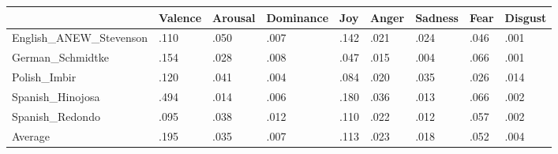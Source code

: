 \begin{tabular}{lllllllll}
\toprule
{} & Valence & Arousal & Dominance &  Joy & Anger & Sadness & Fear & Disgust \\
\midrule
English\_ANEW\_Stevenson &    .110 &    .050 &      .007 & .142 &  .021 &    .024 & .046 &    .001 \\
German\_Schmidtke       &    .154 &    .028 &      .008 & .047 &  .015 &    .004 & .066 &    .001 \\
Polish\_Imbir           &    .120 &    .041 &      .004 & .084 &  .020 &    .035 & .026 &    .014 \\
Spanish\_Hinojosa       &    .494 &    .014 &      .006 & .180 &  .036 &    .013 & .066 &    .002 \\
Spanish\_Redondo        &    .095 &    .038 &      .012 & .110 &  .022 &    .012 & .057 &    .002 \\
Average                &    .195 &    .035 &      .007 & .113 &  .023 &    .018 & .052 &    .004 \\
\bottomrule
\end{tabular}
